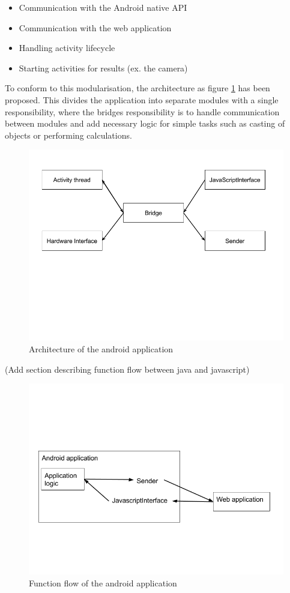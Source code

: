 \documentclass{cslthse-msc}
\begin{document}
\begin{itemize}
\item Communication with the Android native API
\item Communication with the web application
\item Handling activity lifecycle
\item Starting activities for results (ex. the camera)
\end{itemize}


To conform to this modularisation, the architecture as figure \ref{caption-android-architecture} has been proposed. This divides the application into separate modules with a single responsibility, where the bridges responsibility is to handle communication between modules and add necessary logic for simple tasks such as casting of objects or performing calculations. 


\begin{figure}[ht!]
    \centering
    \includegraphics[width=120mm,natwidth=800,natheight=600]{../img/androidStructure.png}
    \caption{Architecture of the android application\label{caption-android-architecture}}
\end{figure}


(Add section describing function flow between java and javascript)

\begin{figure}[ht!]
    \centering
    \includegraphics[width=120mm,natwidth=720,natheight=540]{../img/androidFlow.png}
    \caption{Function flow of the android application\label{caption-android-flow}}
\end{figure}
\end{document}
